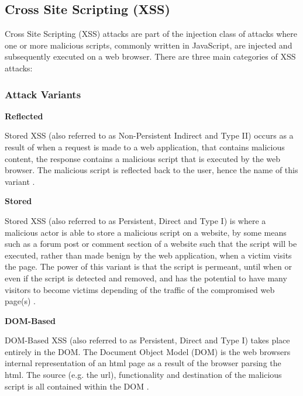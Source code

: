 \documentclass{mscreport}
\begin{document}
\subsection{Cross Site Scripting (XSS)}
\label{subsection:XSS}

Cross Site Scripting (XSS) attacks are part of the injection class of attacks where one or more malicious scripts, commonly written in JavaScript, are injected and subsequently executed on a web browser. There are three main categories of XSS attacks:

\subsubsection{Attack Variants}
\textbf{Reflected}

\vspace{0.2cm} \noindent
Stored XSS (also referred to as Non-Persistent Indirect and Type II) occurs as a result of when a request is made to a web application, that contains malicious content, the response contains a malicious script that is executed by the web browser. The malicious script is reflected back to the user, hence the name of this variant \cite{Rodriguez2020-bg}.

\vspace{0.6cm} \noindent
\textbf{Stored}

\vspace{0.2cm} \noindent
Stored XSS (also referred to as Persistent, Direct and Type I) is where a malicious actor is able to store a malicious script on a website, by some means such as a forum post or comment section of a website such that the script will be executed, rather than made benign by the web application, when a victim visits the page. The power of this variant is that the script is permeant, until when or even if the script is detected and removed, and has the potential to have many visitors to become victims depending of the traffic of the compromised web page(s) \cite{Rodriguez2020-bg}.

\vspace{0.6cm} \noindent
\textbf{DOM-Based}


\vspace{0.2cm} \noindent
DOM-Based XSS (also referred to as Persistent, Direct and Type I) takes place entirely in the DOM. The Document Object Model (DOM) is the web browsers internal representation of an html page as a result of the browser parsing the html. The source (e.g. the url), functionality and destination of the malicious script is all contained within the DOM \cite{Rodriguez2020-bg,Klein2005-hx}.
\end{document}
